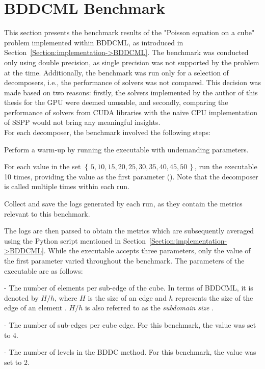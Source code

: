 \section{BDDCML Benchmark}\label{Section:comparing-decomposers-and-solvers->bddcml-benchmark}
This section presents the benchmark results of the "Poisson equation on a cube" problem implemented within BDDCML, as introduced in Section~\ref{Section:implementation->BDDCML}.
The benchmark was conducted only using double precision, as single precision was not supported by the problem at the time.
Additionally, the benchmark was run only for a selection of decomposers, i.e., the performance of solvers was not compared.
This decision was made based on two reasons: firstly, the solvers implemented by the author of this thesis for the GPU were deemed unusable, and secondly, comparing the performance of solvers from CUDA libraries with the naive CPU implementation of SSPP would not bring any meaningful insights.\\
For each decomposer, the benchmark involved the following steps:
%
\begin{tight_enumerate}
	\item Perform a warm-up by running the  executable with undemanding parameters.
	\item For each value in the set $\left\{\, 5, 10, 15, 20, 25, 30, 35, 40, 45, 50\,\right\}$, run the  executable 10 times, providing the value as the first parameter ().
		Note that the decomposer is called multiple times within each run.
	\item Collect and save the logs generated by each run, as they contain the metrics relevant to this benchmark.
\end{tight_enumerate}

The logs are then parsed to obtain the metrics which are subsequently averaged using the Python script mentioned in Section~\ref{Section:implementation->BDDCML}.
While the  executable accepts three parameters, only the value of the first parameter varied throughout the benchmark.
The parameters of the executable are as follows:
%
\begin{tight_enumerate}
	\item {} - The number of elements per sub-edge of the cube.
In terms of BDDCML, it is denoted by $H/h$, where $H$ is the size of an edge and $h$ represents the size of the edge of an element \cite{6ZBqOb318XgFqC5W}. $H/h$ is also referred to as the \textit{subdomain size} \cite{6ZBqOb318XgFqC5W}.
	\item {} - The number of sub-edges per cube edge.
For this benchmark, the value was set to 4.
	\item {} - The number of levels in the BDDC method.
For this benchmark, the value was set to 2.
\end{tight_enumerate}

